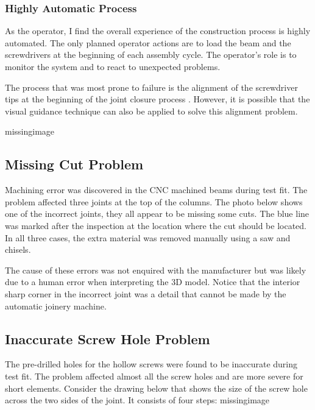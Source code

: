 \subsubsection{Highly Automatic Process}
\label{subsubsection:exploration_4_highly_automatic_process}

As the operator, I find the overall experience of the construction process is highly automated. The only planned operator actions are to load the beam and the screwdrivers at the beginning of each assembly cycle. The operator’s role is to monitor the system and to react to unexpected problems.

The process that was most prone to failure is the alignment of the screwdriver tips at the beginning of the joint closure process . However, it is possible that the visual guidance technique can also be applied to solve this alignment problem. 

missingimage

\subsection{Missing Cut Problem}
\label{subsection:exploration_4_missing_cut_problem}

Machining error was discovered in the CNC machined beams during test fit. The problem affected three joints at the top of the columns. The photo below shows one of the incorrect joints, they all appear to be missing some cuts. The blue line was marked after the inspection at the location where the cut should be located. In all three cases, the extra material was removed manually using a saw and chisels. 

The cause of these errors was not enquired with the manufacturer but was likely due to a human error when interpreting the 3D model. Notice that the interior sharp corner in the incorrect joint was a detail that cannot be made by the automatic joinery machine. 

\subsection{Inaccurate Screw Hole Problem}
\label{subsection:exploration_4_inaccurate_screw_hole_problem}

The pre-drilled holes for the hollow screws were found to be inaccurate during test fit. The problem affected almost all the screw holes and are more severe for short elements.
Consider the drawing below that shows the size of the screw hole across the two sides of the joint. It consists of four steps:
missingimage

